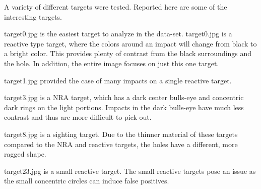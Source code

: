 \documentclass{article}
\begin{document}
A variety of different targets were tested. Reported here are some of the interesting targets.

target0.jpg is the easiest target to analyze in the data-set. target0.jpg is a reactive type target,
where the colors around an impact will change from black to a bright color. This provides
plenty of contrast from the black surroundings and the hole. In addition, the entire image
focuses on just this one target.

target1.jpg provided the case of many impacts on a single reactive target.

target3.jpg is a NRA target, which has a dark center bulls-eye and concentric dark rings
on the light portions. Impacts in the dark bulls-eye have much less contrast and thus are
more difficult to pick out.

target8.jpg is a sighting target. Due to the thinner material of these targets compared
to the NRA and reactive targets, the holes have a different, more ragged shape.

target23.jpg is a small reactive target. The small reactive targets pose an issue
as the small concentric circles can induce false positives.




\end{document}
